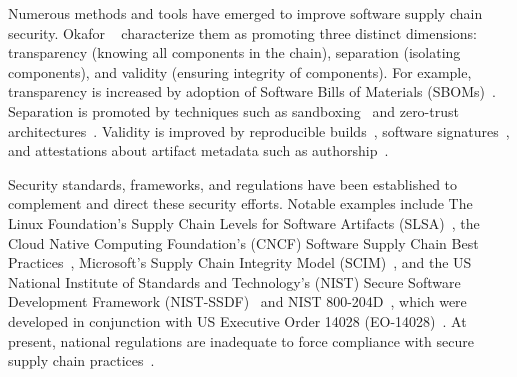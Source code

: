 \documentclass{IEEEcsmagTechrxiv}
\begin{document}


\iffalse
	Numerous methods and tools have emerged to improve software supply chain security.
	Okafor \etal~\cite{okafor_sok} characterize them as promoting three distinct dimensions:
	transparency (knowing all components in the chain),
	separation (isolating components),
	and
	validity (ensuring integrity of components).
	For example, transparency is increased by adoption of Software Bills of Materials (SBOMs)~\cite{ntia_httpswwwntiadocgovfilesntiapublicationsSBOM_minimum_elements_reportpdf_2021,xia_trust_2023}.
	Separation is promoted by techniques such as
	sandboxing~\cite{sun_nativeguard_2014, abbadini_cage4deno_2023, lamowski_sandcrust_2017, vasilakis_breakapp_2018,vasilakis_supply-chain_2021}
	and
	zero-trust architectures~\cite{rose_zero_2020,amusuo2023ztdjava}.
	Validity is improved by
	reproducible builds~\cite{lamb_reproducible_2022,vu_lastpymile_2021},
	software signatures~\cite{schorlemmer_signing_2024},
	and
	attestations about artifact metadata such as authorship~\cite{torres-arias_-toto_2019}.

	Security standards, frameworks, and regulations have been established to complement and direct these security efforts.
	Notable examples include
	The Linux Foundation's Supply Chain Levels for Software Artifacts (SLSA)~\cite{SLSA_The_Linux_Foundation_2023},
	the Cloud Native Computing Foundation's (CNCF) Software Supply Chain Best Practices~\cite{noauthor_cncf_2023},
	Microsoft's Supply Chain Integrity Model (SCIM)~\cite{noauthor_microsoftscim_2023},
	and
	the US National Institute of Standards and Technology's (NIST) Secure Software Development Framework (NIST-SSDF)~\cite{computer_security_division_secure_2021} and NIST 800-204D~\cite{chandramouli2024strategies}, which were developed in conjunction with US Executive Order 14028 (EO-14028)~\cite{nist:eo14028}.
	At present, national regulations are inadequate to force compliance with secure supply chain practices~\cite{ludvigsen_preventing_2022}.
\end{document}
